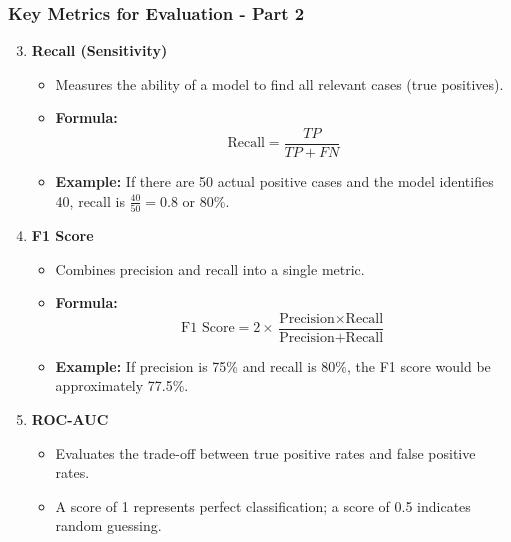 \documentclass[aspectratio=169]{beamer}
\begin{document}
\begin{frame}[fragile]
    \frametitle{Key Metrics for Evaluation - Part 2}
    \begin{enumerate}
        \setcounter{enumi}{2} %
        \item \textbf{Recall (Sensitivity)}  
        \begin{itemize}
            \item Measures the ability of a model to find all relevant cases (true positives).
            \item \textbf{Formula:}  
            \[
            \text{Recall} = \frac{TP}{TP + FN}
            \]
            \item \textbf{Example:} If there are 50 actual positive cases and the model identifies 40, recall is \( \frac{40}{50} = 0.8 \) or 80\%.
        \end{itemize}

        \item \textbf{F1 Score}  
        \begin{itemize}
            \item Combines precision and recall into a single metric.
            \item \textbf{Formula:}  
            \[
            \text{F1 Score} = 2 \times \frac{\text{Precision} \times \text{Recall}}{\text{Precision} + \text{Recall}}
            \]
            \item \textbf{Example:} If precision is 75\% and recall is 80\%, the F1 score would be approximately 77.5\%.
        \end{itemize}

        \item \textbf{ROC-AUC}  
        \begin{itemize}
            \item Evaluates the trade-off between true positive rates and false positive rates.
            \item A score of 1 represents perfect classification; a score of 0.5 indicates random guessing.
        \end{itemize}
    \end{enumerate}
\end{frame}
\end{document}
